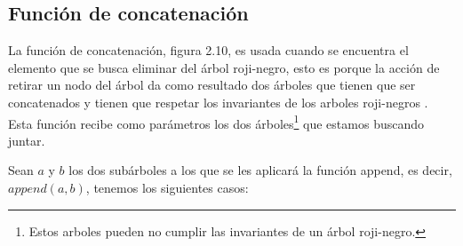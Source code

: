 \documentclass[8pt,leqno,pdflatex,spanish]{book}
\newcommand{\arn}{árbol roji-negro}
\newcommand{\arns}{arboles roji-negros}
\theoremstyle{plain}
\theoremstyle{definition}
\theoremstyle{remark}
\begin{document}
\subsection{Funci\'on de concatenaci\'on}

La funci\'on de concatenación, figura 2.10, es usada cuando se encuentra el elemento que se busca 
eliminar del {\arn}, esto es porque la acci\'on de retirar un nodo del \'arbol da como resultado 
dos \'arboles que tienen que ser concatenados y tienen que respetar los invariantes de los {\arns}
. Esta funci\'on recibe como parámetros los dos \'arboles\footnote{Estos arboles pueden no cumplir 
las invariantes de un {\arn}.} que estamos buscando juntar. 

Sean $a$ y $b$ los dos subárboles a los que se les aplicar\'a la funci\'on append, es decir, 
$append(a,b)$, tenemos los siguientes casos:
\end{document}
